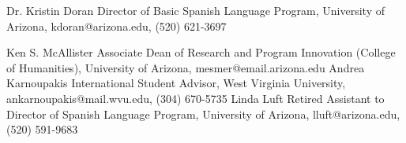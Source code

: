 


\begin{cvskills}

\vspace{5mm}
\cvskill
{Dr. Kristin Doran} %
{Director of Basic Spanish Language Program, 
University of Arizona,\newline
kdoran@arizona.edu, 
(520) 621-3697} %

\vspace{5mm}
\cvskill
{Ken S. McAllister} %
{Associate Dean of Research and Program Innovation (College of Humanities),
University of Arizona,\newline 
mesmer@email.arizona.edu} %
\vspace{5mm}
\cvskill
{Andrea Karnoupakis} %
{International Student Advisor, 
West Virginia University, \newline 
ankarnoupakis@mail.wvu.edu, 
(304) 670-5735} %
\vspace{5mm}
\cvskill
{Linda Luft} %
{Retired Assistant to Director of Spanish Language Program, 
University of Arizona, \newline
lluft@arizona.edu, 
(520) 591-9683} %

\vspace{-7mm}
\end{cvskills}